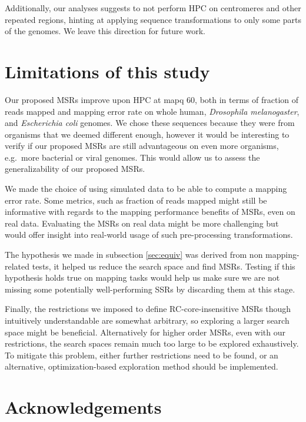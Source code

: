 \documentclass[
  11pt,
  twoside]{scrbook}
\begin{document}
Additionally, our analyses suggests to not perform HPC on centromeres and other repeated regions, hinting at applying sequence transformations to only some parts of the genomes. We leave this direction for future work.

\hypertarget{limitations-of-this-study}{%
\section{Limitations of this study}\label{limitations-of-this-study}}

Our proposed MSRs improve upon HPC at mapq 60, both in terms of fraction of reads mapped and mapping error rate on whole human, \emph{Drosophila melanogaster}, and \emph{Escherichia coli} genomes. We chose these sequences because they were from organisms that we deemed different enough, however it would be interesting to verify if our proposed MSRs are still advantageous on even more organisms, e.g.~more bacterial or viral genomes. This would allow us to assess the generalizability of our proposed MSRs.

We made the choice of using simulated data to be able to compute a mapping error rate. Some metrics, such as fraction of reads mapped might still be informative with regards to the mapping performance benefits of MSRs, even on real data. Evaluating the MSRs on real data might be more challenging but would offer insight into real-world usage of such pre-processing transformations.

The hypothesis we made in subsection \ref{sec:equiv} was derived from non mapping-related tests, it helped us reduce the search space and find MSRs. Testing if this hypothesis holds true on mapping tasks would help us make sure we are not missing some potentially well-performing SSRs by discarding them at this stage.

Finally, the restrictions we imposed to define RC-core-insensitive MSRs though intuitively understandable are somewhat arbitrary, so exploring a larger search space might be beneficial. Alternatively for higher order MSRs, even with our restrictions, the search spaces remain much too large to be explored exhaustively. To mitigate this problem, either further restrictions need to be found, or an alternative, optimization-based exploration method should be implemented.

\hypertarget{acknowledgements}{%
\section*{Acknowledgements}\label{acknowledgements}}
\end{document}
